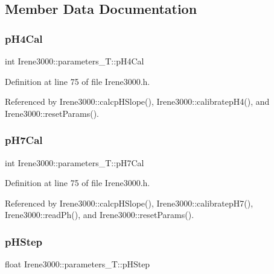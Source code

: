 \subsection{Member Data Documentation}
\mbox{\label{structIrene3000_1_1parameters__T_a1144de6fb54eb3e1dd2a3d8c2afc97dc}} 
\subsubsection{\texorpdfstring{p\+H4\+Cal}{pH4Cal}}
{\footnotesize\ttfamily int Irene3000\+::parameters\+\_\+\+T\+::p\+H4\+Cal}



Definition at line 75 of file Irene3000.\+h.



Referenced by Irene3000\+::calcp\+H\+Slope(), Irene3000\+::calibratep\+H4(), and Irene3000\+::reset\+Params().

\mbox{\label{structIrene3000_1_1parameters__T_a21265466a570d84bff914f26d2f7a03e}} 
\subsubsection{\texorpdfstring{p\+H7\+Cal}{pH7Cal}}
{\footnotesize\ttfamily int Irene3000\+::parameters\+\_\+\+T\+::p\+H7\+Cal}



Definition at line 75 of file Irene3000.\+h.



Referenced by Irene3000\+::calcp\+H\+Slope(), Irene3000\+::calibratep\+H7(), Irene3000\+::read\+Ph(), and Irene3000\+::reset\+Params().

\mbox{\label{structIrene3000_1_1parameters__T_a61cfcc2539d5f630e9071f3753aba9fe}} 
\subsubsection{\texorpdfstring{p\+H\+Step}{pHStep}}
{\footnotesize\ttfamily float Irene3000\+::parameters\+\_\+\+T\+::p\+H\+Step}



